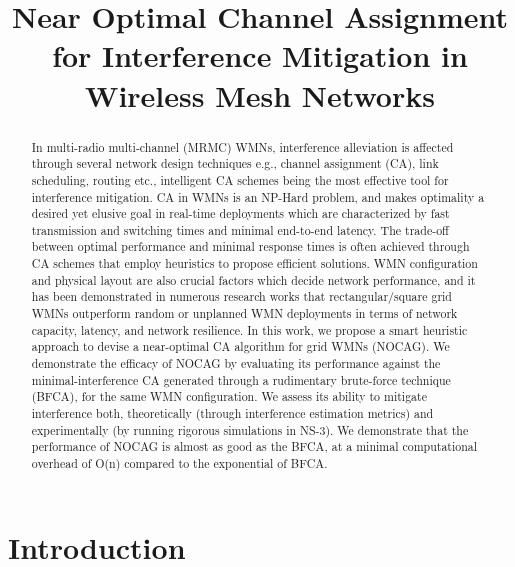 \documentclass[conference]{IEEEtran}
\begin{document}



\title{Near Optimal Channel Assignment for Interference Mitigation in Wireless Mesh Networks}


\author{
}

\maketitle

\begin{abstract}
In multi-radio multi-channel (MRMC) WMNs, interference alleviation is affected through several network design techniques 
e.g., channel assignment (CA), link scheduling, routing  etc., intelligent CA schemes being the most effective tool for interference mitigation. 
CA in WMNs is an NP-Hard problem, and makes optimality a desired yet elusive goal in real-time deployments which are characterized by fast transmission and switching times and minimal end-to-end latency. 
The trade-off between optimal performance and minimal response times is often achieved through CA schemes that employ heuristics to propose efficient solutions. 
WMN configuration and physical layout are also crucial factors which decide network performance, and it has been demonstrated in numerous research works
that rectangular/square grid WMNs outperform random or unplanned WMN deployments in terms of network capacity, latency, and network resilience. 
In this work, we propose a smart heuristic approach to devise a near-optimal CA algorithm for grid WMNs (NOCAG). 
We demonstrate the efficacy of NOCAG by evaluating its performance against the minimal-interference CA generated through a rudimentary brute-force technique (BFCA), for the same WMN configuration. 
We assess its ability to mitigate interference both, theoretically (through interference estimation metrics) and experimentally (by running rigorous simulations in NS-3). 
We demonstrate that the performance of NOCAG is almost
as good as the BFCA, at a minimal computational overhead of O(n) compared to the exponential of BFCA.
\end{abstract}

\section{Introduction}
\end{document}
